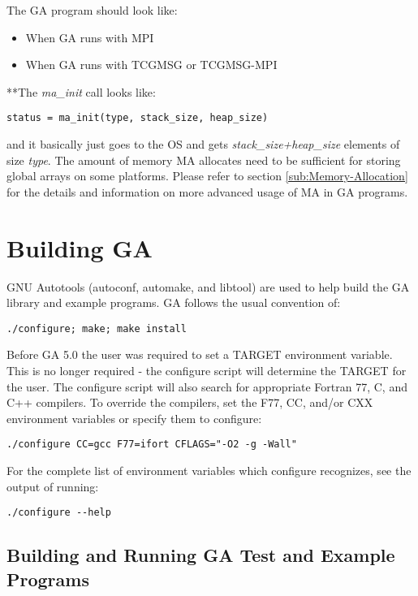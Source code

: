 The GA program should look like:
\begin{itemize}
\item When GA runs with MPI
\end{itemize}


\begin{itemize}
\item When GA runs with TCGMSG or TCGMSG-MPI
\end{itemize}


{*}{*}The \emph{ma\_init} call looks like:
\begin{verbatim}
status = ma_init(type, stack_size, heap_size)
\end{verbatim}
and it basically just goes to the OS and gets \emph{stack\_size+heap\_size}
elements of size \emph{type}. The amount of memory MA allocates need to be
sufficient for storing global arrays on some platforms. Please refer to section
\ref{sub:Memory-Allocation} for the details and information on more advanced
usage of MA in GA programs. 

\section{Building GA}

GNU Autotools (autoconf, automake, and libtool) are used to help build the GA
library and example programs. GA follows the usual convention of:
\begin{verbatim}
./configure; make; make install 
\end{verbatim}
Before GA 5.0 the user was required to set a TARGET environment variable. This
is no longer required - the configure script will determine the TARGET for the
user. The configure script will also search for appropriate Fortran 77, C, and
C++ compilers. To override the compilers, set the F77, CC, and/or CXX
environment variables or specify them to configure:
\begin{verbatim}
./configure CC=gcc F77=ifort CFLAGS="-O2 -g -Wall"
\end{verbatim}
For the complete list of environment variables which configure recognizes, see
the output of running: 
\begin{verbatim}
./configure --help
\end{verbatim}

\subsection{Building and Running GA Test and Example Programs}


